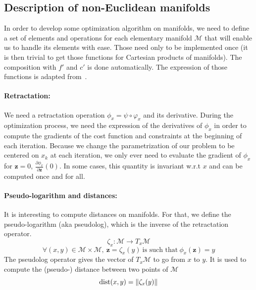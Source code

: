 \subsection{Description of non-Euclidean manifolds}
\label{sub:examples_on_non_euclidean_manifolds}

In order to develop some optimization algorithm on manifolds, we need to define a set of elements and operations for each elementary manifold $\mathcal{M}$ that will enable us to handle its elements with ease.
Those need only to be implemented once (it is then trivial to get those functions for Cartesian products of manifolds).
The composition with $f'$ and $c'$ is done automatically.
The expression of those functions is adapted from~\cite{boumal:jmlr:2014}.

\paragraph{Retractation:}
We need a retractation operation $\phi_x = \psi\circ\varphi_x$ and its derivative.
During the optimization process, we need the expression of the derivatives of $\phi_x$ in order to compute the gradients of the cost function and constraints at the beginning of each iteration.
Because we change the parametrization of our problem to be centered on $x_k$ at each iteration, we only ever need to evaluate the gradient of $\phi_x$ for $\mathbf{z}=0$, $\frac{\partial \phi_x}{\partial \mathbf{z}}(0)$.
In some cases, this quantity is invariant w.r.t $x$ and can be computed once and for all.

\paragraph{Pseudo-logarithm and distances:}
It is interesting to compute distances on manifolds.
For that, we define the pseudo-logarithm (aka pseudolog), which is the inverse of the retractation operator.
\begin{equation*}
  \zeta_x:\mathcal{M}\rightarrow T_x\mathcal{M}
\end{equation*}
\begin{equation*}
  \forall (x,y)\in \mathcal{M}\times\mathcal{M},\ \mathbf{z}=\zeta_x(y)\ \text{is such that}\ \phi_x(\mathbf{z}) = y
\end{equation*}
The pseudolog operator gives the vector of $T_x\mathcal{M}$ to go from $x$ to $y$.
It is used to compute the (pseudo-) distance between two points of $\mathcal{M}$
\begin{equation*}
  \operatorname{dist}(x,y) = \|\zeta_x(y)\|
\end{equation*}

